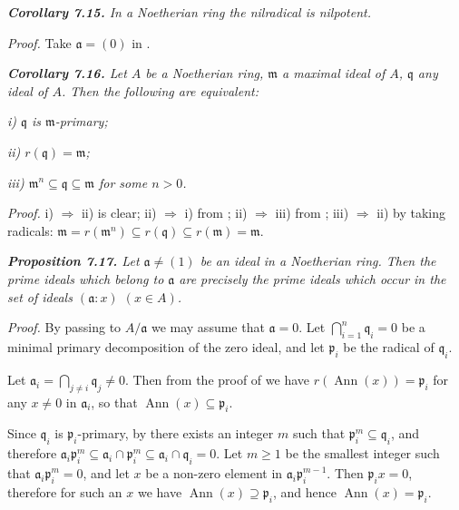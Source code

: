 \medskip
\noindent\textit{\textbf{Corollary 7.15.} In a Noetherian ring the nilradical is nilpotent.}

\noindent\emph{Proof.}  Take $\mathfrak a=(0)$ in .\proofbox

\medskip
\noindent\textit{\textbf{Corollary 7.16.} Let $A$ be a Noetherian ring, $\mathfrak m$ a maximal ideal of $A$, $\mathfrak q$ any
ideal of $A$.  Then the following are equivalent:}

\noindent\textit{i) $\mathfrak q$ is $\mathfrak m$-primary;}

\noindent\textit{ii) $r(\mathfrak q)=\mathfrak m$;}

\noindent\textit{iii) $\mathfrak m^n\subseteq\mathfrak q\subseteq\mathfrak m$ for some $n>0$.}

\noindent\emph{Proof.}  i) $\Rightarrow$ ii) is clear; ii) $\Rightarrow$ i) from ; ii) $\Rightarrow$ iii) from ; iii) $\Rightarrow$ ii) by
taking radicals: $\mathfrak m=r(\mathfrak m^n)\subseteq r(\mathfrak q)\subseteq r(\mathfrak m)=\mathfrak m$.\proofbox

\medskip
\noindent\textit{\textbf{Proposition 7.17.} Let $\mathfrak a\ne(1)$ be an ideal in a Noetherian ring.  Then the
prime ideals which belong to $\mathfrak a$ are precisely the prime ideals which occur in the
set of ideals $(\mathfrak a:x)$ $(x\in A)$.}

\noindent\emph{Proof.}  By passing to $A/\mathfrak a$ we may assume that $\mathfrak a=0$.  Let $\bigcap_{i=1}^n\mathfrak q_i=0$ be a
minimal primary decomposition of the zero ideal, and let $\mathfrak p_i$ be the radical of $\mathfrak q_i$.

Let $\mathfrak a_i=\bigcap_{j\ne i}\mathfrak q_j\ne0$.  Then from the proof of  we have $r(\operatorname{Ann}(x))=\mathfrak p_i$
for any $x\ne0$ in $\mathfrak a_i$, so that $\operatorname{Ann}(x)\subseteq\mathfrak p_i$.

Since $\mathfrak q_i$ is $\mathfrak p_i$-primary, by  there exists an integer $m$ such that $\mathfrak p_i^m\subseteq\mathfrak q_i$,
and therefore $\mathfrak a_i\mathfrak p_i^m\subseteq\mathfrak a_i\cap\mathfrak p_i^m\subseteq\mathfrak a_i\cap\mathfrak q_i=0$.  Let $m\geq1$ be the smallest
integer such that $\mathfrak a_i\mathfrak p_i^m=0$, and let $x$ be a non-zero element in $\mathfrak a_i\mathfrak p_i^{m-1}$.  Then
$\mathfrak p_ix=0$, therefore for such an $x$ we have $\operatorname{Ann}(x)\supseteq\mathfrak p_i$, and hence $\operatorname{Ann}(x)=\mathfrak p_i$.

